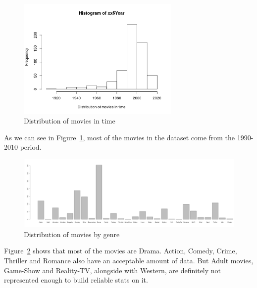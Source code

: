 \begin{figure}[!ht]
\begin{center}
\includegraphics[width=0.70\textwidth]{../src/pre-processing/stats/results/distYears.png}
\end{center}
\caption{Distribution of movies in time}
\label{fig:distYears}
\end{figure}
As we can see in Figure~\ref{fig:distYears}, most of the movies in the dataset come from the 1990-2010 period.

\begin{figure}[!ht]
\begin{center}
\includegraphics[width=1.1\textwidth]{../src/pre-processing/stats/results/Distribution genres.png}
\end{center}
\caption{Distribution of movies by genre}
\label{fig:distGenres}
\end{figure}
Figure~\ref{fig:distGenres} shows that most of the movies are Drama. Action, Comedy, Crime, Thriller and Romance also have an acceptable amount of data.
But Adult movies, Game-Show and Reality-TV, alongside with Western, are definitely not represented enough to build reliable stats on it.


